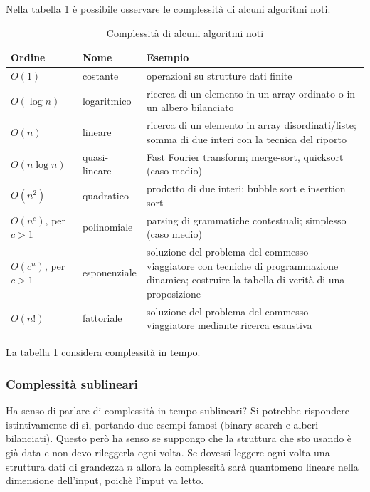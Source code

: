 Nella tabella \ref{algocomp} è possibile osservare le complessità di alcuni algoritmi noti:
\begin{table}[h]
    \begin{tabular}{|l|l|p{7cm}|}
        \hline
        \textbf{Ordine} & \textbf{Nome} & \textbf{Esempio} \\
        \hline
        $O(1)$ & costante & operazioni su strutture dati finite \\
        \hline
        $O(\log n)$ & logaritmico & ricerca di un elemento in un array ordinato o in un albero
        bilanciato \\
        \hline
        $O(n)$ & lineare & ricerca di un elemento in array disordinati/liste; somma di due interi con la
        tecnica del riporto\\
        \hline
        $O(n\log n)$ & quasi-lineare & Fast Fourier transform; merge-sort, quicksort (caso medio)\\
        \hline
        $O(n^{2})$ & quadratico & prodotto di due interi; bubble sort e insertion sort \\
        \hline
        $O(n^{c})$, per $c > 1$ & polinomiale & parsing di grammatiche contestuali; simplesso (caso
        medio)\\
        \hline
        $O(c^{n})$, per $c > 1$ & esponenziale & soluzione del problema del commesso viaggiatore con
        tecniche di programmazione dinamica; costruire la tabella di verità di una proposizione \\
        \hline
        $O(n!)$ & fattoriale & soluzione del problema del commesso viaggiatore mediante ricerca esaustiva \\
        \hline
    \end{tabular}
    \caption{Complessità di alcuni algoritmi noti}
    \label{algocomp}
\end{table}

La tabella \ref{algocomp} considera complessità in tempo.

\subsubsection{Complessità sublineari}

Ha senso di parlare di complessità in tempo sublineari? Si potrebbe rispondere istintivamente di
sì, portando due esempi famosi (binary search e alberi bilanciati). Questo però ha senso se
suppongo che la struttura che sto usando è già data e non devo rileggerla ogni volta. Se dovessi
leggere ogni volta una struttura dati di grandezza $n$ allora la complessità sarà quantomeno
lineare nella dimensione dell'input, poichè l'input va letto.

